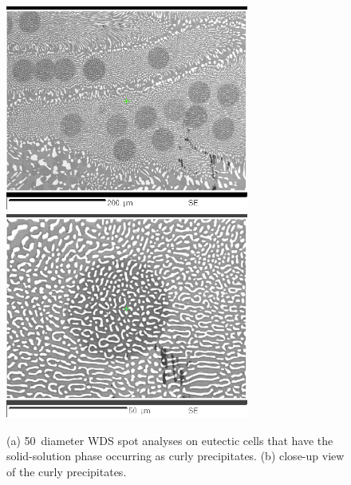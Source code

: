 %
\begin{figure}[htbp]
\begin{center}
\includegraphics[width=8cm]{manual9_curly11to21}
\includegraphics[width=8cm]{manual8_curlyii}
\caption{(a) 50\micro\metre\ diameter WDS spot analyses on eutectic cells that have the solid-solution phase occurring as curly precipitates.  (b) close-up view of the curly precipitates.}\label{fig:curly}
\end{center}
\end{figure}
%
%
